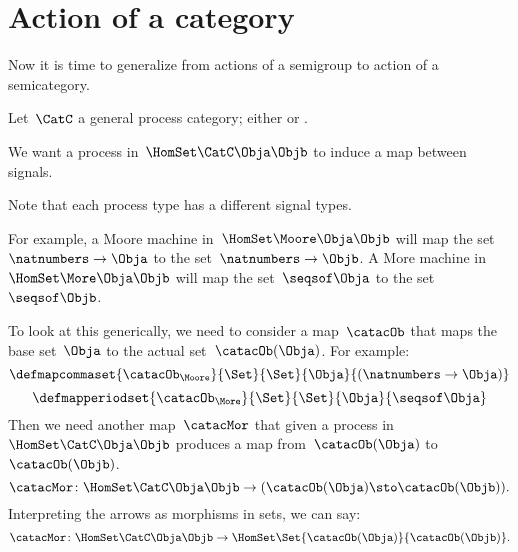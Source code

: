 
\section{Action of a category}



Now it is time to generalize from actions of a semigroup to action of a semicategory.

Let~$\CatC$ a general process category; either \Moore or \More.

We want a process in~$\HomSet\CatC\Obja\Objb$ to induce a map between signals.

Note that each process type has a different signal types.

For example, a Moore machine in~$\HomSet\Moore\Obja\Objb$ will map the set~$\natnumbers \to \Obja$ to the set~$\natnumbers \to \Objb$.
A More machine in~$\HomSet\More\Obja\Objb$  will map the set~$\seqsof \Obja$ to the set~$\seqsof \Objb$.

To look at this generically, we need to consider a map~$\catacOb$ that maps the base set~$\Obja$ to the actual set~$\catacOb(\Obja)$.
For example:
%
\begin{equation}
	\defmapcommaset{
		\catacOb_{\Moore}
	}{
		\Set
	}{
		\Set
	}{
		\Obja
	}{
		(\natnumbers \to \Obja)
	}
\end{equation}
%
\begin{equation}
	\defmapperiodset{
		\catacOb_{\More}
	}{
		\Set
	}{
		\Set
	}{
		\Obja
	}{
		\seqsof \Obja
	}
\end{equation}
%
Then we need another map~$\catacMor$ that given a process in~$\HomSet\CatC\Obja\Objb$ produces a map from~$\catacOb(\Obja)$ to~$\catacOb(\Objb)$.
%
\begin{equation}
	\label{eq:gamma-1}
	\catacMor\colon \HomSet\CatC\Obja\Objb \to  (\catacOb(\Obja) \sto \catacOb(\Objb)).
\end{equation}
%
Interpreting the arrows as morphisms in sets, we can say:
%
\begin{equation}
	\label{eq:gamma-2}
	\catacMor\colon \HomSet\CatC\Obja\Objb \to  \HomSet\Set{\catacOb(\Obja)}{\catacOb(\Objb) }.
\end{equation}
%

